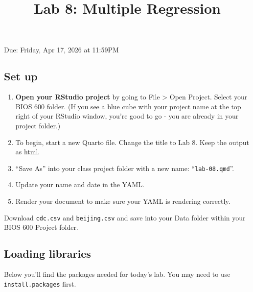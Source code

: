 \documentclass[
  letterpaper,
  DIV=11,
  numbers=noendperiod]{scrartcl}
\title{Lab 8: Multiple Regression}
\author{}
\date{}
\begin{document}
\maketitle


Due: Friday, Apr 17, 2026 at 11:59PM

\subsection{Set up}\label{set-up}

\begin{enumerate}
\def\labelenumi{\arabic{enumi}.}
\item
  \textbf{Open your RStudio project} by going to File \textgreater{}
  Open Project. Select your BIOS 600 folder. (If you see a blue cube
  with your project name at the top right of your RStudio window, you're
  good to go - you are already in your project folder.)
\item
  To begin, start a new Quarto file. Change the title to Lab 8. Keep the
  output as html.
\item
  ``Save As'' into your class project folder with a new name:
  ``\texttt{lab-08.qmd}''.
\item
  Update your name and date in the YAML.
\item
  Render your document to make sure your YAML is rendering correctly.
\end{enumerate}

\begin{tcolorbox}[enhanced jigsaw, arc=.35mm, bottomrule=.15mm, bottomtitle=1mm, breakable, colback=white, colbacktitle=quarto-callout-tip-color!10!white, colframe=quarto-callout-tip-color-frame, coltitle=black, left=2mm, leftrule=.75mm, opacityback=0, opacitybacktitle=0.6, rightrule=.15mm, title=\textcolor{quarto-callout-tip-color}{\faLightbulb}\hspace{0.5em}{Data download}, titlerule=0mm, toprule=.15mm, toptitle=1mm]

Download \texttt{cdc.csv} and \texttt{beijing.csv} and save into your
Data folder within your BIOS 600 Project folder.

\end{tcolorbox}

\subsection{Loading libraries}\label{loading-libraries}

Below you'll find the packages needed for today's lab. You may need to
use \texttt{install.packages} first.
\end{document}
